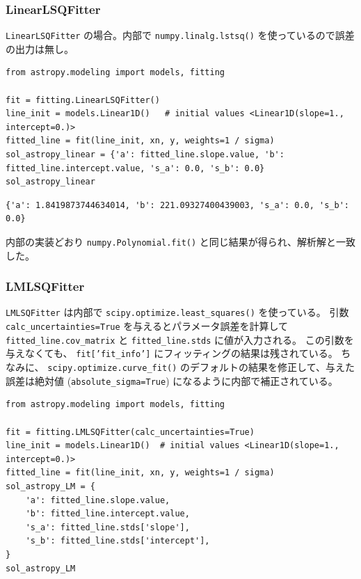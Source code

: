 \documentclass[a4paper, 9pt, notitlepage, uplatex, dvipdfmx]{jsarticle}
\begin{document}
\subsubsection{LinearLSQFitter}
\label{sec:org936af52}
\texttt{LinearLSQFitter} の場合。内部で \texttt{numpy.linalg.lstsq()} を使っているので誤差の出力は無し。
\begin{verbatim}
from astropy.modeling import models, fitting

fit = fitting.LinearLSQFitter()
line_init = models.Linear1D()   # initial values <Linear1D(slope=1., intercept=0.)>
fitted_line = fit(line_init, xn, y, weights=1 / sigma)
sol_astropy_linear = {'a': fitted_line.slope.value, 'b': fitted_line.intercept.value, 's_a': 0.0, 's_b': 0.0}
sol_astropy_linear
\end{verbatim}

\label{}
\begin{verbatim}
{'a': 1.8419873744634014, 'b': 221.09327400439003, 's_a': 0.0, 's_b': 0.0}
\end{verbatim}

内部の実装どおり \texttt{numpy.Polynomial.fit()} と同じ結果が得られ、解析解と一致した。
\subsubsection{LMLSQFitter}
\label{sec:org116b6a1}
\texttt{LMLSQFitter} は内部で \texttt{scipy.optimize.least\_squares()} を使っている。
引数 \texttt{calc\_uncertainties=True} を与えるとパラメータ誤差を計算して \texttt{fitted\_line.cov\_matrix} と \texttt{fitted\_line.stds} に値が入力される。
この引数を与えなくても、 \texttt{fit['fit\_info']} にフィッティングの結果は残されている。
ちなみに、 \texttt{scipy.optimize.curve\_fit()} のデフォルトの結果を修正して、与えた誤差は絶対値 (\texttt{absolute\_sigma=True}) になるように内部で補正されている。

\begin{verbatim}
from astropy.modeling import models, fitting

fit = fitting.LMLSQFitter(calc_uncertainties=True)
line_init = models.Linear1D()  # initial values <Linear1D(slope=1., intercept=0.)>
fitted_line = fit(line_init, xn, y, weights=1 / sigma)
sol_astropy_LM = {
    'a': fitted_line.slope.value,
    'b': fitted_line.intercept.value,
    's_a': fitted_line.stds['slope'],
    's_b': fitted_line.stds['intercept'],
}
sol_astropy_LM
\end{verbatim}
\end{document}
